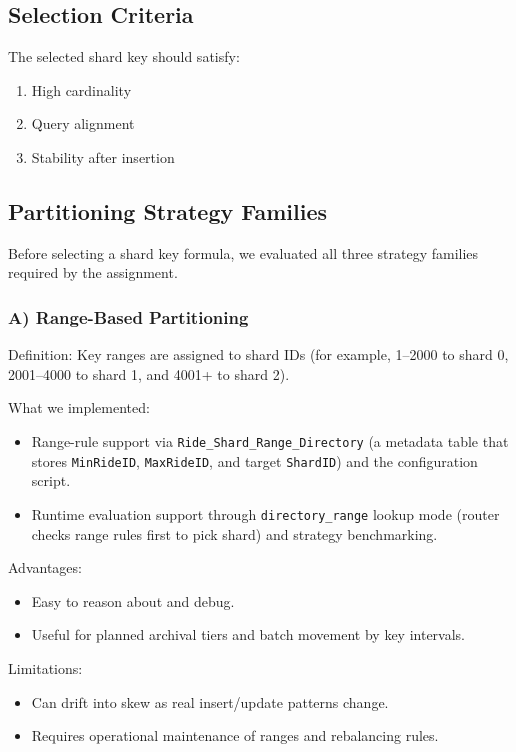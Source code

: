 \documentclass[12pt]{article}
\begin{document}
\subsection{Selection Criteria}

The selected shard key should satisfy:
\begin{enumerate}
    \item High cardinality
    \item Query alignment
    \item Stability after insertion
\end{enumerate}

\subsection{Partitioning Strategy Families}

Before selecting a shard key formula, we evaluated all three strategy families required by the assignment.

\subsubsection*{A) Range-Based Partitioning}

Definition: Key ranges are assigned to shard IDs (for example, 1--2000 to shard 0, 2001--4000 to shard 1, and 4001+ to shard 2).

What we implemented:
\begin{itemize}
    \item Range-rule support via \texttt{Ride\_Shard\_Range\_Directory} (a metadata table that stores \texttt{MinRideID}, \texttt{MaxRideID}, and target \texttt{ShardID}) and the configuration script.
    \item Runtime evaluation support through \texttt{directory\_range} lookup mode (router checks range rules first to pick shard) and strategy benchmarking.
\end{itemize}

Advantages:
\begin{itemize}
    \item Easy to reason about and debug.
    \item Useful for planned archival tiers and batch movement by key intervals.
\end{itemize}

Limitations:
\begin{itemize}
    \item Can drift into skew as real insert/update patterns change.
    \item Requires operational maintenance of ranges and rebalancing rules.
\end{itemize}
\end{document}
